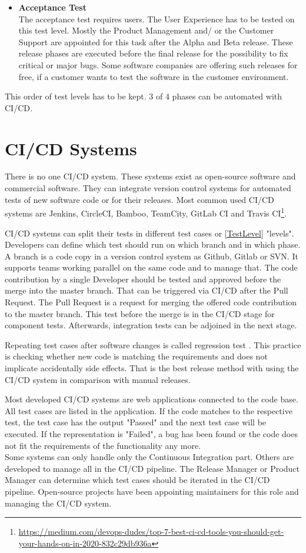 \begin{itemize}
\item \textbf{Acceptance Test} \\
The acceptance test requires users. The User Experience has to be tested on this test level. Mostly the Product Management and/ or the Customer Support are appointed for this task after the Alpha and Beta release. These release phases are executed before the final release for the possibility to fix critical or major bugs.
Some software companies are offering such releases for free, if a customer wants to test the software in the customer environment.
\end{itemize}
This order of test levels has to be kept. 3 of 4 phases can be automated with CI/CD. 

\section{CI/CD Systems} \label{CI-CD}

There is no one CI/CD system. These systems exist as open-source software and commercial software. They can integrate version control systems for automated tests of new software code or for their releases. Most common used CI/CD systems are Jenkins, CircleCI, Bamboo, TeamCity, GitLab CI and Travis CI\footnote{\url{https://medium.com/devops-dudes/top-7-best-ci-cd-tools-you-should-get-your-hands-on-in-2020-832c29db936a}}.

CI/CD systems can split their tests in different test cases or \ref{TestLevel} "levels". Developers can define which test should run on which branch and in which phase. A branch is a code copy in a version control system as Github, Gitlab or SVN. It supports teams working parallel on the same code and to manage that. The code contribution by a single Developer should be tested and approved before the merge into the master branch. That can be triggered via CI/CD after the Pull Request. The Pull Request is a request for merging the offered code contribution to the master branch. This test before the merge is in the CI/CD stage for component tests. Afterwards, integration tests can be adjoined in the next stage.

Repeating test cases after software changes is called regression test \cite[~p.98]{Spillner2019}. This practice is checking whether new code is matching the requirements and does not implicate accidentally side effects. That is the best release method with using the CI/CD system in comparison with manual releases.

Most developed CI/CD systems are web applications connected to the code base. All test cases are listed in the application. If the code matches to the respective test, the test case has the output "Passed" and the next test case will be executed. If the representation is "Failed", a bug has been found or the code does not fit the requirements of the functionality any more. \\
Some systems can only handle only the Continuous Integration part. Others are developed to manage all in the CI/CD pipeline.
The Release Manager or Product Manager can determine which test cases should be iterated in the CI/CD pipeline. Open-source projects have been appointing maintainers for this role and managing the CI/CD system.

